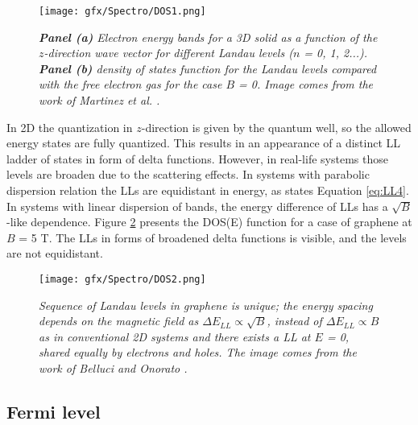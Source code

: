 \documentclass[titlepage,a4paper]{book}
\newcommand{\wciecie}{\quad\phantom{v}}
\begin{document}
\begin{figure}[ht]
	\centering
	\texttt{[image: gfx/Spectro/DOS1.png]}
	\vspace{-10pt}
	\caption{\textit{\textbf{Panel (a)} Electron energy bands for a 3D solid as a function of the $z$-direction wave vector for different Landau levels ($n$ = 0, 1, 2...). \textbf{Panel (b)} density of states function for the Landau levels compared with the free electron gas for the case $B$ = 0. Image comes from the work of Martinez \textit{et al.} \cite{Martinez_Nanotechnology}.}}
	\label{fig:DOS1}
\end{figure}

In 2D the quantization in $z$-direction is given by the quantum well, so the allowed energy states are fully quantized. This results in an appearance of a distinct LL ladder of states in form of delta functions. However, in real-life systems those levels are broaden due to the scattering effects. In systems with parabolic dispersion relation the LLs are equidistant in energy, as states Equation \ref{eq:LL4}. In systems with linear dispersion of bands, the energy difference of LLs has a $\sqrt{B}$-like dependence. Figure \ref{fig:DOS2} presents the DOS(E) function for a case of graphene at $B$ = 5 T. The LLs in forms of broadened delta functions is visible, and the levels are not equidistant. 

\begin{figure}[H]
	\centering
	\texttt{[image: gfx/Spectro/DOS2.png]}
	\vspace{-10pt}
	\caption{\textit{Sequence of Landau levels in graphene is unique; the energy spacing depends on the magnetic field as $\Delta E_{LL} \propto \sqrt{B}$, instead of $\Delta E_{LL} \propto B$ as in conventional 2D systems and there exists a LL at $E$ = 0, shared equally by electrons and holes. The image comes from the work of Belluci and Onorato \cite{Belluci_DOS}.}}
	\label{fig:DOS2}
\end{figure}

\subsection{Fermi level}
\label{section:Fermi_level}
\wciecie
\end{document}
